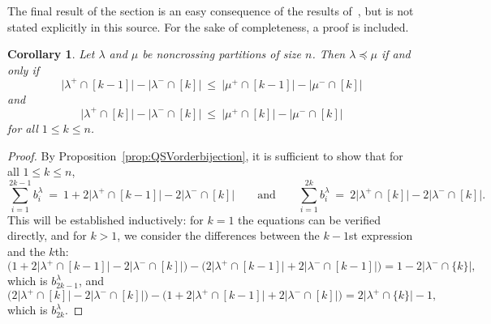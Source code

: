 \documentclass[12pt]{amsart}
\newtheorem{cor}[equation]{Corollary}
\theoremstyle{definition}
\theoremstyle{remark}
\numberwithin{equation}{section}
\begin{document}
The final result of the section is an easy consequence of the results of~\cite{GobetWilliams}, but is not stated explicitly in this source.  For the sake of completeness, a proof is included.

\begin{cor}
\label{cor:bruhatncphelper}
Let $\lambda$ and $\mu$ be noncrossing partitions of size $n$.  Then $\lambda \preceq \mu$ if and only if 
\[
\big|\lambda^{+} \cap [k-1]\big| - \big|\lambda^{-} \cap [k]\big| \ \le\  \big|\mu^{+} \cap [k-1]\big| - \big|\mu^{-} \cap [k]\big|
\]
and
\[
\big|\lambda^{+} \cap [k]\big| - \big|\lambda^{-} \cap [k]\big|\  \le \  \big|\mu^{+} \cap [k]\big| - \big|\mu^{-} \cap [k]\big| 
\]
for all $1 \le k \le n$.
\end{cor}
\begin{proof}
By Proposition~\ref{prop:QSVorderbijection}, it is sufficient to show that for all $1 \le k \le n$,
\[
\sum_{i = 1}^{2k - 1} b^{\lambda}_{i}  \ = \ 1 + 2\big|\lambda^{+} \cap [k-1]\big| - 2\big|\lambda^{-} \cap [k]\big|
\qquad\text{and}\qquad
\sum_{i = 1}^{2k} b^{\lambda}_{i} \  = \ 2\big|\lambda^{+} \cap [k]\big| - 2\big|\lambda^{-} \cap [k]\big|.
\] 
This will be established inductively: for $k = 1$ the equations can be verified directly, and for $k > 1$, we consider the differences between the $k-1$st expression and the $k$th: 
\[
\Big(1 + 2\big|\lambda^{+} \cap [k-1]\big| - 2\big|\lambda^{-} \cap [k]\big|\Big) - \Big(2\big|\lambda^{+} \cap [k-1]\big| + 2\big|\lambda^{-} \cap [k-1]\big|\Big)
= 1 - 2\big|\lambda^{-} \cap \{k\}\big|,
\]
which is $b^{\lambda}_{2k-1}$, and 
\[
\Big(2\big|\lambda^{+} \cap [k]\big| - 2\big|\lambda^{-} \cap [k]\big|\Big) - \Big(1 + 2\big|\lambda^{+} \cap [k-1]\big| + 2\big|\lambda^{-} \cap [k]\big|\Big) = 2\big|\lambda^{+} \cap \{k\}\big| - 1,
\]
which is $b^{\lambda}_{2k}$.
\end{proof}
\end{document}
